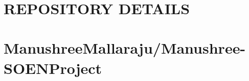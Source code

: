 \documentclass[10pt]{article}
\title{{\large\textbf{\normalsize }}}
\begin{document}
\section*{{REPOSITORY DETAILS}}

 \section*{{\normalsize ManushreeMallaraju/Manushree-SOEN\textunderscore Project}}
\end{document}
